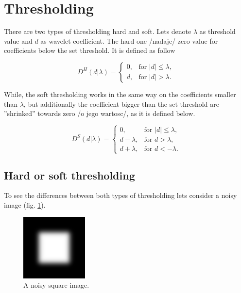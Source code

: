 \section{Thresholding}
\label{sec:threshold}
There are two types of thresholding hard and soft. Lets denote $\lambda$ as threshold value and $d$ as wavelet coefficient. The hard one /nadaje/ zero value for coefficients below the set threshold. It is defined as follow

\begin{equation}
D^H(d|\lambda)=
\begin{cases}
0, & \text{for } |d| \leq \lambda, \\
d, & \text{for } |d| > \lambda.
\end{cases}
\end{equation}

While, the soft thresholding works in the same way on the coefficients smaller than $\lambda$, but additionally the coefficient bigger than the set threshold are ''shrinked'' towards zero /o jego wartosc/, as it is defined below.

\begin{equation}
D^S(d|\lambda)=
\begin{cases}
	0, & \text{for } |d| \leq \lambda, \\
	d-\lambda, & \text{for } d > \lambda, \\
	d+\lambda, & \text{for } d < -\lambda.
\end{cases}
\end{equation}


\subsection{Hard or soft thresholding}

To see the differences between both types of thresholding lets consider a noisy image (fig. \ref{fig:square_s10}).

\begin{figure}[h]
	\centering
	\includegraphics[width=0.3\textwidth]{graphs/square_s10.png}
	\caption{A noisy square image.}
	\label{fig:square_s10}
\end{figure}

